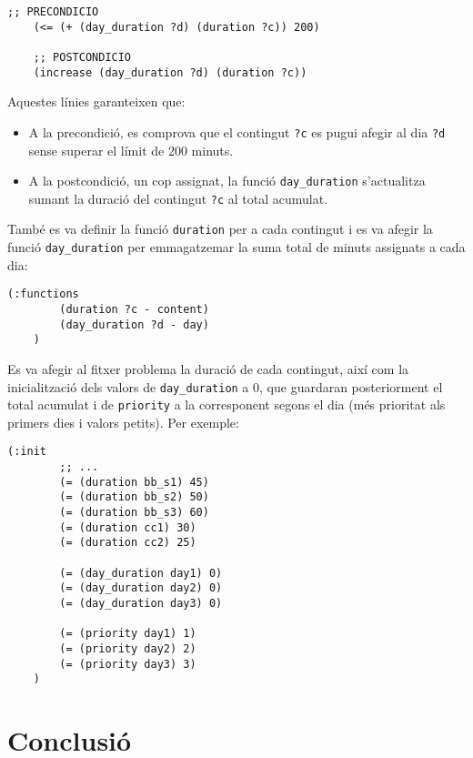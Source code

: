 \documentclass[a4paper]{article}
\begin{document}
	\begin{lstlisting}[language=PDDL, caption={Restriccions per controlar el límit de 200 minuts per dia}, label={lst:extensio4}]
	;; PRECONDICIO
	(<= (+ (day_duration ?d) (duration ?c)) 200)
	
	;; POSTCONDICIO
	(increase (day_duration ?d) (duration ?c))
	\end{lstlisting}
	
	Aquestes línies garanteixen que:
	\begin{itemize}
		\item A la precondició, es comprova que el contingut \texttt{?c} es pugui afegir al dia \texttt{?d} sense superar el límit de 200 minuts.
		\item A la postcondició, un cop assignat, la funció \texttt{day\_duration} s'actualitza sumant la duració del contingut \texttt{?c} al total acumulat.
	\end{itemize}
	
	També es va definir la funció \texttt{duration} per a cada contingut i es va afegir la funció \texttt{day\_duration} per emmagatzemar la suma total de minuts assignats a cada dia:
	\begin{lstlisting}[language=PDDL, caption={Funcions per l'extensió 4}, label={lst:funcionsExtensio4}]
	(:functions
		(duration ?c - content)
		(day_duration ?d - day)
	)
	\end{lstlisting}
	
	Es va afegir al fitxer problema la duració de cada contingut, així com la inicialització dels valors de \texttt{day\_duration} a 0, que guardaran posteriorment el total acumulat i de \texttt{priority} a la corresponent segons el dia (més prioritat als primers dies i valors petits). Per exemple:
	\begin{lstlisting}[language=PDDL, caption={Novetats en la inicialització per l'extensió 4}, label={lst:iniExtensio4}]
	(:init
		;; ...
		(= (duration bb_s1) 45)
		(= (duration bb_s2) 50)
		(= (duration bb_s3) 60)
		(= (duration cc1) 30)
		(= (duration cc2) 25)
		
		(= (day_duration day1) 0)
		(= (day_duration day2) 0)
		(= (day_duration day3) 0)

		(= (priority day1) 1)
		(= (priority day2) 2)
		(= (priority day3) 3)
	)
	\end{lstlisting}

	
	\newpage
	\section{Conclusió}
	
\end{document}
